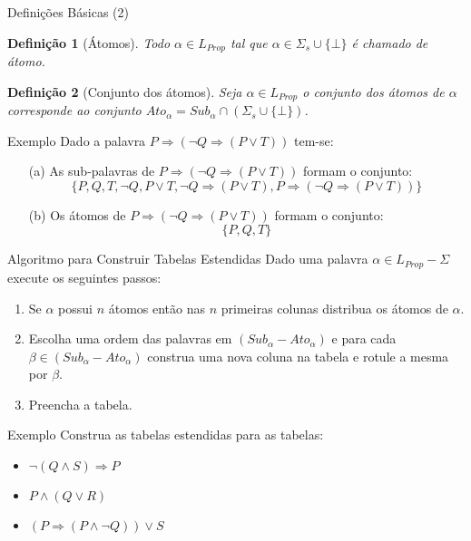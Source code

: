 \documentclass[aspectratio=169]{beamer}
\newtheorem{defi}{Definição}
\begin{document}
	\begin{frame}{Definições Básicas (2)}
		\begin{defi}[Átomos]
			Todo $\alpha \in L_{Prop}$ tal que $\alpha \in \Sigma_s \cup \{\bot\}$ é chamado de átomo.
		\end{defi}
		\pause
		\begin{defi}[Conjunto dos átomos]
			Seja $\alpha \in L_{Prop}$ o conjunto dos átomos de $\alpha$  corresponde ao conjunto $Ato_\alpha = Sub_\alpha \cap (\Sigma_s \cup \{\bot\})$. 
		\end{defi}
	\end{frame}

	\begin{frame}{Exemplo}
		Dado a palavra $P \Rightarrow (\neg Q \Rightarrow (P \lor T))$ tem-se:
		\begin{itemize}
			\item[(a)] As sub-palavras de $P \Rightarrow (\neg Q \Rightarrow (P \lor T))$ formam o conjunto:\pause
			$$\{P, Q, T, \neg Q, P \lor T, \neg Q \Rightarrow (P \lor T), P \Rightarrow (\neg Q \Rightarrow (P \lor T))\}$$
			\item[(b)] Os átomos de $P \Rightarrow (\neg Q \Rightarrow (P \lor T))$ formam o conjunto:\pause
			$$\{P, Q, T\}$$
		\end{itemize}
	\end{frame}

	\begin{frame}{Algoritmo para Construir Tabelas Estendidas}
		Dado uma palavra $\alpha \in L_{Prop} - \Sigma$ execute os seguintes passos:
		\begin{enumerate}
			\item Se $\alpha$ possui $n$ átomos então nas $n$ primeiras colunas distribua os átomos de $\alpha$.
			\item Escolha uma ordem das palavras em $(Sub_\alpha - Ato_\alpha)$ e para cada $\beta \in (Sub_\alpha - Ato_\alpha)$ construa uma nova coluna na tabela e rotule a mesma por $\beta$.
			\item Preencha a tabela.
		\end{enumerate}
	\end{frame}

	\begin{frame}{Exemplo}
		Construa as tabelas estendidas para as tabelas:
		\begin{itemize}
			\item $\neg(Q \land S) \Rightarrow P$
			\item $P \land (Q \lor R)$
			\item $(P \Rightarrow (P \land \neg Q)) \lor S$
		\end{itemize}
	\end{frame}
\end{document}
